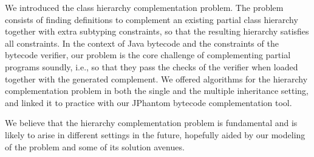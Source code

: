 We introduced the class hierarchy complementation problem. The problem
consists of finding definitions to complement an existing partial
class hierarchy together with extra subtyping constraints, so that the
resulting hierarchy satisfies all constraints. In the context of Java
bytecode and the constraints of the bytecode verifier, our problem is
the core challenge of complementing partial programs soundly, i.e., so
that they pass the checks of the verifier when loaded together with
the generated complement. We offered algorithms for the hierarchy
complementation problem in both the single and the multiple
inheritance setting, and linked it to practice with our JPhantom
bytecode complementation tool.

We believe that the hierarchy complementation problem is fundamental
and is likely to arise in different settings in the future, hopefully
aided by our modeling of the problem and some of its solution avenues.



